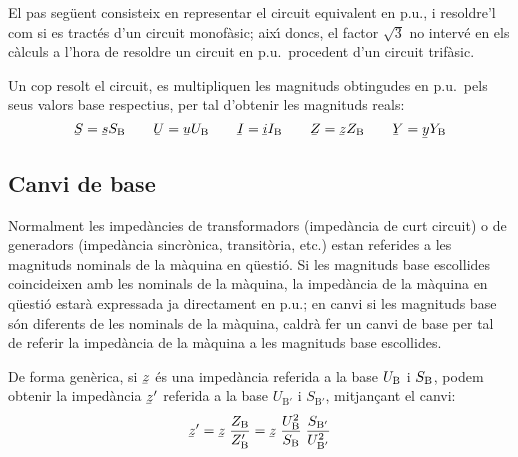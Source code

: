 El pas seg\"{u}ent consisteix en representar el circuit equivalent en p.u., i resoldre'l com si es tract\'{e}s d'un circuit monof\`{a}sic; aix\'{\i} doncs, el factor $\sqrt{3}$ no interv\'{e} en els c\`{a}lculs a l'hora de resoldre un circuit en p.u.\ procedent d'un circuit trif\`{a}sic.

Un cop resolt el circuit, es multipliquen les magnituds obtingudes en p.u.\ pels
seus valors base respectius, per tal d'obtenir les magnituds reals:
\begin{equation}
   \cmplx{S} = \cmplx{s} S\ped{B} \qquad \cmplx{U} = \cmplx{u} U\ped{B} \qquad \cmplx{I} = \cmplx{i} I\ped{B} \qquad \cmplx{Z} = \cmplx{z} Z\ped{B} \qquad \cmplx{Y} = \cmplx{y} Y\ped{B}
\end{equation}

\subsection{Canvi de base} 

Normalment les imped\`{a}ncies de transformadors (imped\`{a}ncia de curt circuit) o de generadors (imped\`{a}ncia sincr\`{o}nica, transit\`{o}ria, etc.) estan referides a les magnituds nominals de la m\`{a}quina en q\"{u}esti\'{o}. Si les magnituds base escollides coincideixen amb les nominals de la m\`{a}quina, la imped\`{a}ncia de la m\`{a}quina en q\"{u}esti\'{o} estar\`{a} expressada ja directament en p.u.; en canvi si les magnituds base s\'{o}n diferents de les nominals de la m\`{a}quina, caldr\`{a} fer un canvi de base per tal de referir la imped\`{a}ncia de la m\`{a}quina a les magnituds base escollides.

De forma gen\`{e}rica, si $\cmplx{z}$ \'{e}s una imped\`{a}ncia referida a la base $U_\mathrm{B}$ i $S_\mathrm{B}$, podem obtenir la imped\`{a}ncia $\cmplx{z}'$ referida a la base $U_{\text{B}'}$ i $S_{\text{B}'}$, mitjan\c{c}ant el canvi:
\begin{equation}
   \cmplx{z}' = \cmplx{z} \; \frac{Z\ped{B}}{Z\ped{B}'} = \cmplx{z} \; \frac{U\ped{B}^2}{S\ped{B}} \; \frac{S_{\text{B}'}}{U_{\text{B}'}^2}
\end{equation}

